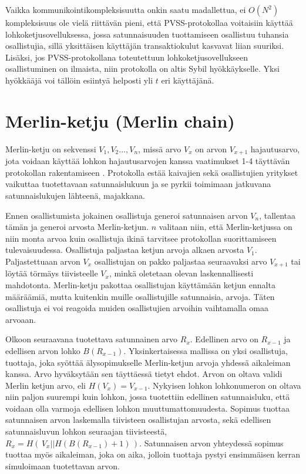 Vaikka kommunikointikompleksisuutta onkin saatu madallettua, ei $O(N^2)$ kompleksisuus ole vielä riittävän pieni, että PVSS-protokollaa voitaisiin käyttää lohkoketjusovelluksessa, jossa satunnaisuuden tuottamiseen osallistuu tuhansia osallistujia, sillä yksittäisen käyttäjän transaktiokulut kasvavat liian suuriksi. Lisäksi, jos PVSS-protokollana toteutettuun lohkoketjusovellukseen osallistuminen on ilmaista, niin protokolla on altis Sybil hyökkäykselle. Yksi hyökkääjä voi tällöin esiintyä helposti yli $t$ eri käyttäjänä.

\section{Merlin-ketju (Merlin chain)}

Merlin-ketju on sekvenssi $V_1, V_2 ... , V_n$, missä arvo $V_x$ on arvon $V_{x+1}$ hajautusarvo, jota voidaan käyttää lohkon hajautusarvojen kanssa vaatimukset 1-4 täyttävän protokollan rakentamiseen \cite{MerlinChains}. Protokolla estää kaivajien sekä osallistujien yritykset vaikuttaa tuotettavaan satunnaislukuun ja se pyrkii toimimaan jatkuvana satunnaislukujen lähteenä, majakkana. 

Ennen osallistumista jokainen osallistuja generoi satunnaisen arvon $V_n$, tallentaa tämän ja generoi arvosta Merlin-ketjun. $n$ valitaan niin, että Merlin-ketjussa on niin monta arvoa kuin osallistuja ikinä tarvitsee protokollan suorittamiseen tulevaisuudessa. Osallistuja paljastaa ketjun arvoja alkaen arvosta $V_1$. Paljastettuaan arvon $V_x$ osallistujan on pakko paljastaa seuraavaksi arvo $V_{x+1}$ tai löytää törmäys tiivisteelle $V_x$, minkä oletetaan olevan laskennallisesti mahdotonta. Merlin-ketju pakottaa osallistujan käyttämään ketjun ennalta määräämiä, mutta kuitenkin muille osallistujille satunnaisia, arvoja. Täten osallistuja ei voi reagoida muiden osallistujien arvoihin vaihtamalla omaa arvoaan.  

Olkoon seuraavana tuotettava satunnainen arvo $R_x$. Edellinen arvo on $R_{x-1}$ ja edellisen arvon lohko $B(R_{x-1})$.
Yksinkertaisessa mallissa on yksi osallistuja, tuottaja, joka syöttää älysopimukselle Merlin-ketjun arvoja yhdessä aikaleiman kanssa. Arvo hyväksytään sen täyttäessä tietyt ehdot. Arvon on oltava validi Merlin ketjun arvo, eli $H(V_x) = V_{x-1}$. Nykyisen lohkon lohkonumeron on oltava niin paljon suurempi kuin lohkon, jossa tuotettiin edellinen satunnaisluku, että voidaan olla varmoja edellisen lohkon muuttumattomuudesta. Sopimus tuottaa satunnaisen arvon laskemalla tiivisteen osallistujan arvosta, sekä edellisen satunnaisluvun lohkon seuraajan tiivisteestä, $R_x = H(\, V_x || H(B(R_{x-1})+1) \,)$. Satunnaisen arvon yhteydessä sopimus tuottaa myös aikaleiman, joka on aika, jolloin tuottaja pystyi ensimmäisen kerran simuloimaan tuotettavan arvon. 

